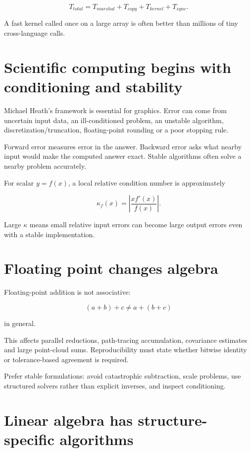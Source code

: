 \[
T_{total}=T_{marshal}+T_{copy}+T_{kernel}+T_{sync}.
\]

A fast kernel called once on a large array is often better than millions of tiny cross-language calls.

\section{Scientific computing begins with conditioning and stability}\label{01-foundations-i-ch017-scientific-computing-begins-with-conditioning-and-stability}

Michael Heath's framework is essential for graphics. Error can come from uncertain input data, an ill-conditioned problem, an unstable algorithm, discretization/truncation, floating-point rounding or a poor stopping rule.

Forward error measures error in the answer. Backward error asks what nearby input would make the computed answer exact. Stable algorithms often solve a nearby problem accurately.

For scalar \(y=f(x)\), a local relative condition number is approximately

\[
\kappa_f(x)=\left|\frac{x f'(x)}{f(x)}\right|.
\]

Large \(\kappa\) means small relative input errors can become large output errors even with a stable implementation.

\section{Floating point changes algebra}\label{01-foundations-i-ch017-floating-point-changes-algebra}

Floating-point addition is not associative:

\[
(a+b)+c\neq a+(b+c)
\]

in general.

This affects parallel reductions, path-tracing accumulation, covariance estimates and large point-cloud sums. Reproducibility must state whether bitwise identity or tolerance-based agreement is required.

Prefer stable formulations: avoid catastrophic subtraction, scale problems, use structured solvers rather than explicit inverses, and inspect conditioning.

\section{Linear algebra has structure-specific algorithms}\label{01-foundations-i-ch017-linear-algebra-has-structure-specific-algorithms}


